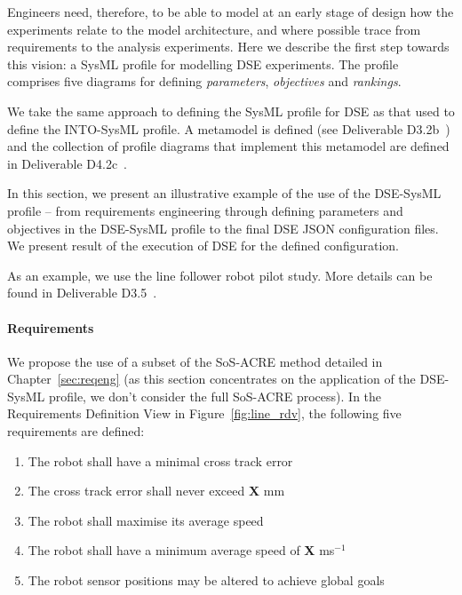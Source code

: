 Engineers need, therefore, to be able to model at an early stage of design how the experiments relate to the model architecture, and where possible trace from requirements to the analysis experiments. Here we describe the first step towards this vision: a SysML profile for modelling DSE experiments. The profile comprises five diagrams for defining \emph{parameters}, \emph{objectives} and \emph{rankings}.

We take the same approach to defining the SysML profile for DSE as that used to define the INTO-SysML profile.  A metamodel is defined (see Deliverable D3.2b~\cite{INTOCPSD3.2b}) and the collection of profile diagrams that implement this metamodel are defined in Deliverable D4.2c~\cite{INTOCPSD4.2c}.

In this section, we present an illustrative example of the use of the DSE-SysML profile -- from requirements engineering through defining parameters and objectives in the DSE-SysML profile to the final DSE JSON configuration files. We present result of the execution of DSE for the defined configuration.

As an example, we use the line follower robot pilot study. More details can be found in Deliverable D3.5~\cite{INTOCPSD3.5}.

\paragraph{Requirements}

We propose the use of a subset of the SoS-ACRE method detailed in Chapter~\ref{sec:reqeng} (as this section concentrates on the application of the DSE-SysML profile, we don't consider the full SoS-ACRE process). In the Requirements Definition View in Figure~\ref{fig:line_rdv}, the following five requirements are defined:

\begin{enumerate}
	\item The robot shall have a minimal cross track error
	\item The cross track error shall never exceed \textbf{X} mm
	\item The robot shall maximise its average speed
	\item The robot shall have a minimum average speed of \textbf{X} ms$^{-1}$
	\item The robot sensor positions may be altered to achieve global goals
\end{enumerate}

